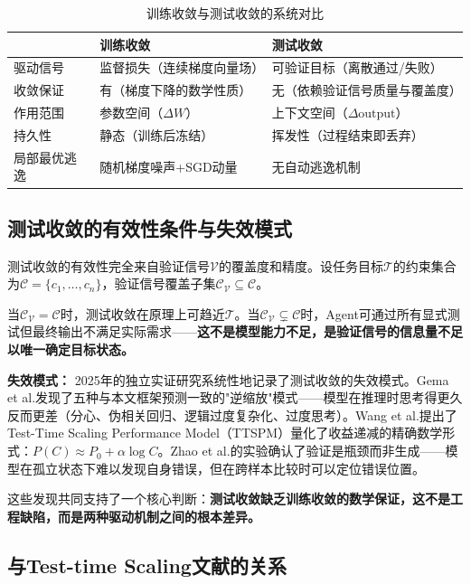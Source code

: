 \documentclass[11pt,a4paper]{ctexart}
\begin{document}
\begin{table}[htbp]
\centering
\caption{训练收敛与测试收敛的系统对比}
\label{tab:two_convergences}
\begin{tabular}{@{}p{3cm}ll@{}}
\toprule
& \textbf{训练收敛} & \textbf{测试收敛} \\
\midrule
驱动信号      & 监督损失（连续梯度向量场） & 可验证目标（离散通过/失败） \\
收敛保证      & 有（梯度下降的数学性质） & 无（依赖验证信号质量与覆盖度） \\
作用范围      & 参数空间（$\Delta W$） & 上下文空间（$\Delta \text{output}$） \\
持久性        & 静态（训练后冻结） & 挥发性（过程结束即丢弃） \\
局部最优逃逸  & 随机梯度噪声+SGD动量 & 无自动逃逸机制 \\
\bottomrule
\end{tabular}
\end{table}

\subsection{测试收敛的有效性条件与失效模式}

测试收敛的有效性完全来自验证信号$\mathcal{V}$的覆盖度和精度。设任务目标$\mathcal{T}$的约束集合为$\mathcal{C} = \{c_1, \dots, c_n\}$，验证信号覆盖子集$\mathcal{C}_{\mathcal{V}} \subseteq \mathcal{C}$。

当$\mathcal{C}_{\mathcal{V}} = \mathcal{C}$时，测试收敛在原理上可趋近$\mathcal{T}$。当$\mathcal{C}_{\mathcal{V}} \subsetneq \mathcal{C}$时，Agent可通过所有显式测试但最终输出不满足实际需求——\textbf{这不是模型能力不足，是验证信号的信息量不足以唯一确定目标状态。}

\textbf{失效模式：} 2025年的独立实证研究系统性地记录了测试收敛的失效模式。Gema et al.\cite{Gema2025Inverse}发现了五种与本文框架预测一致的"逆缩放"模式——模型在推理时思考得更久反而更差（分心、伪相关回归、逻辑过度复杂化、过度思考）。Wang et al.\cite{Wang2025TTSPM}提出了Test-Time Scaling Performance Model（TTSPM）量化了收益递减的精确数学形式：$P(C) \approx P_0 + \alpha \log C$。Zhao et al.\cite{Zhao2025Verification}的实验确认了验证是瓶颈而非生成——模型在孤立状态下难以发现自身错误，但在跨样本比较时可以定位错误位置。

这些发现共同支持了一个核心判断：\textbf{测试收敛缺乏训练收敛的数学保证，这不是工程缺陷，而是两种驱动机制之间的根本差异。}

\subsection{与Test-time Scaling文献的关系}
\end{document}
